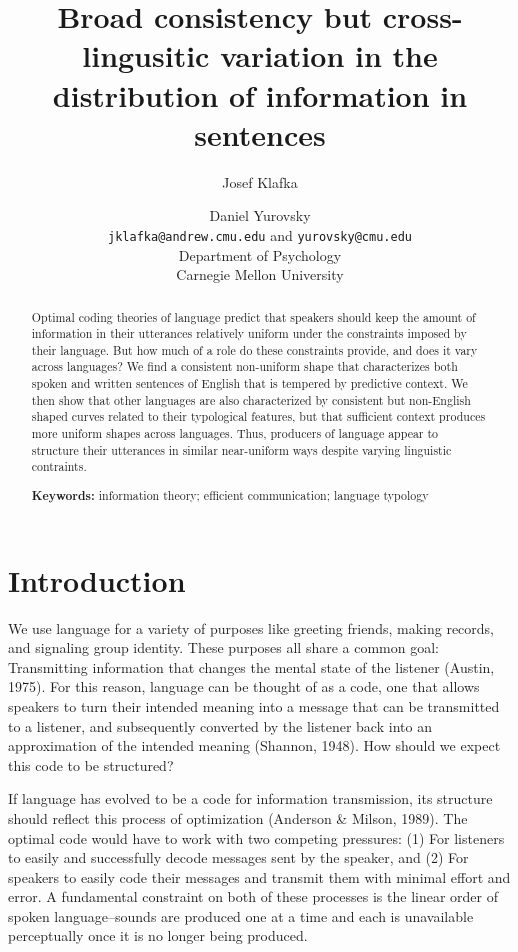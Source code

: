 \documentclass[10pt, letterpaper]{article}
\title{Broad consistency but cross-lingusitic variation in the distribution of
information in sentences}
\author{Josef Klafka \and Daniel Yurovsky \\
        \texttt{jklafka@andrew.cmu.edu} and \texttt{yurovsky@cmu.edu} \\
       Department of Psychology \\ Carnegie Mellon University}
\begin{document}
\maketitle

\begin{abstract}
Optimal coding theories of language predict that speakers should keep
the amount of information in their utterances relatively uniform under
the constraints imposed by their language. But how much of a role do
these constraints provide, and does it vary across languages? We find a
consistent non-uniform shape that characterizes both spoken and written
sentences of English that is tempered by predictive context. We then
show that other languages are also characterized by consistent but
non-English shaped curves related to their typological features, but
that sufficient context produces more uniform shapes across languages.
Thus, producers of language appear to structure their utterances in
similar near-uniform ways despite varying linguistic contraints.

\textbf{Keywords:}
information theory; efficient communication; language typology
\end{abstract}

\hypertarget{introduction}{%
\section{Introduction}\label{introduction}}

We use language for a variety of purposes like greeting friends, making
records, and signaling group identity. These purposes all share a common
goal: Transmitting information that changes the mental state of the
listener (Austin, 1975). For this reason, language can be thought of as
a code, one that allows speakers to turn their intended meaning into a
message that can be transmitted to a listener, and subsequently
converted by the listener back into an approximation of the intended
meaning (Shannon, 1948). How should we expect this code to be
structured?

If language has evolved to be a code for information transmission, its
structure should reflect this process of optimization (Anderson \&
Milson, 1989). The optimal code would have to work with two competing
pressures: (1) For listeners to easily and successfully decode messages
sent by the speaker, and (2) For speakers to easily code their messages
and transmit them with minimal effort and error. A fundamental
constraint on both of these processes is the linear order of spoken
language--sounds are produced one at a time and each is unavailable
perceptually once it is no longer being produced.
\end{document}
